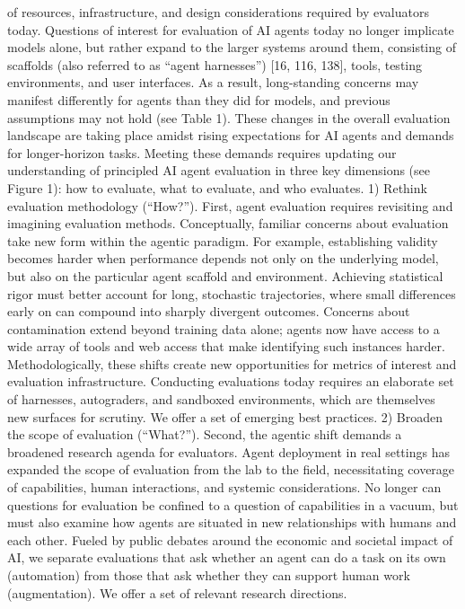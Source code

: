 of resources, infrastructure, and design considerations required by evaluators today. Questions of interest
for evaluation of AI agents today no longer implicate models alone, but rather expand to the larger systems
around them, consisting of scaffolds (also referred to as “agent harnesses”) [16, 116, 138], tools, testing
environments, and user interfaces. As a result, long-standing concerns may manifest differently for agents
than they did for models, and previous assumptions may not hold (see Table 1). These changes in the
overall evaluation landscape are taking place amidst rising expectations for AI agents and demands for
longer-horizon tasks. Meeting these demands requires updating our understanding of principled AI agent
evaluation in three key dimensions (see Figure 1): how to evaluate, what to evaluate, and who evaluates.
1) Rethink evaluation methodology (“How?”). First, agent evaluation requires revisiting and imagining
evaluation methods. Conceptually, familiar concerns about evaluation take new form within the agentic
paradigm. For example, establishing validity becomes harder when performance depends not only on the
underlying model, but also on the particular agent scaffold and environment. Achieving statistical rigor must
better account for long, stochastic trajectories, where small differences early on can compound into sharply
divergent outcomes. Concerns about contamination extend beyond training data alone; agents now have
access to a wide array of tools and web access that make identifying such instances harder. Methodologically,
these shifts create new opportunities for metrics of interest and evaluation infrastructure. Conducting
evaluations today requires an elaborate set of harnesses, autograders, and sandboxed environments, which
are themselves new surfaces for scrutiny. We offer a set of emerging best practices.
2) Broaden the scope of evaluation (“What?”). Second, the agentic shift demands a broadened research
agenda for evaluators. Agent deployment in real settings has expanded the scope of evaluation from the
lab to the field, necessitating coverage of capabilities, human interactions, and systemic considerations.
No longer can questions for evaluation be confined to a question of capabilities in a vacuum, but must
also examine how agents are situated in new relationships with humans and each other. Fueled by public
debates around the economic and societal impact of AI, we separate evaluations that ask whether an
agent can do a task on its own (automation) from those that ask whether they can support human work
(augmentation). We offer a set of relevant research directions.
